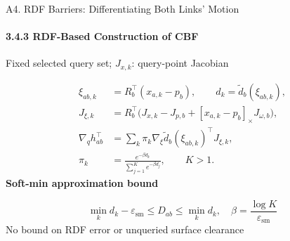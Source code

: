 \documentclass[t,10pt,handout]{beamer}
\newenvironment{slidebody}{\begin{minipage}[t][68.5mm][s]{\linewidth}\vspace{0pt}}{\par\vspace{0pt}\end{minipage}}
\begin{document}
\begin{frame}{A4. RDF Barriers: Differentiating Both Links' Motion}
  \hypertarget{appendix-a4}{}
  \framesubtitle{3.4.3 RDF-Based Construction of CBF}
  \begin{slidebody}
    \setlength{\abovedisplayskip}{3pt}\setlength{\belowdisplayskip}{3pt}
    \centering Fixed selected query set; $J_{x,k}$: query-point Jacobian\par\vfill
    \begin{align*}
      \xi_{ab,k}            & =R_b^\top(x_{a,k}-p_b),\qquad d_k=\tilde d_b(\xi_{ab,k}),             \\[1mm]
      J_{\xi,k}             & =R_b^\top\big(J_{x,k}-J_{p,b}+[x_{a,k}-p_b]_\times J_{\omega,b}\big), \\[1mm]
      \nabla_qh_{ab}^{\top} & =\sum_k\pi_k\nabla_\xi\tilde d_b(\xi_{ab,k})^\top J_{\xi,k},          \\[1mm]
      \pi_k                 & =\frac{e^{-\beta d_k}}{\sum_{j=1}^K e^{-\beta d_j}},\qquad K>1.
    \end{align*}\vfill
    \textbf{Soft-min approximation bound}~\cite{molnar2023composing}\par
    \[\min_kd_k-\varepsilon_{\mathrm{sm}}\leq D_{ab}\leq\min_kd_k,
      \quad\beta=\frac{\log K}{\varepsilon_{\mathrm{sm}}}\]\vfill
    No bound on RDF error or unqueried surface clearance\par\vfill
  \end{slidebody}
\end{frame}
\end{document}
